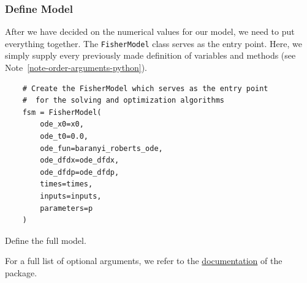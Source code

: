 \documentclass[graybox]{svmult}
\begin{document}
\subsubsection{Define Model}
After we have decided on the numerical values for our model, we need to put everything together.
The \texttt{FisherModel} class serves as the entry point.
Here, we simply supply every previously made definition of variables and methods (see Note~\ref{note-order-arguments-python}).
\begin{code}[H]
    \begin{verbatim}
    # Create the FisherModel which serves as the entry point
    #  for the solving and optimization algorithms
    fsm = FisherModel(
        ode_x0=x0,
        ode_t0=0.0,
        ode_fun=baranyi_roberts_ode,
        ode_dfdx=ode_dfdx,
        ode_dfdp=ode_dfdp,
        times=times,
        inputs=inputs,
        parameters=p
    )
    \end{verbatim}
    \caption{Define the full model.}
    \label{code:model_definition}
\end{code}
\noindent For a full list of optional arguments, we refer to the \href{https://spatial-systems-biology-freiburg.github.io/eDPM/}{documentation} of the package.
%
%
\end{document}
